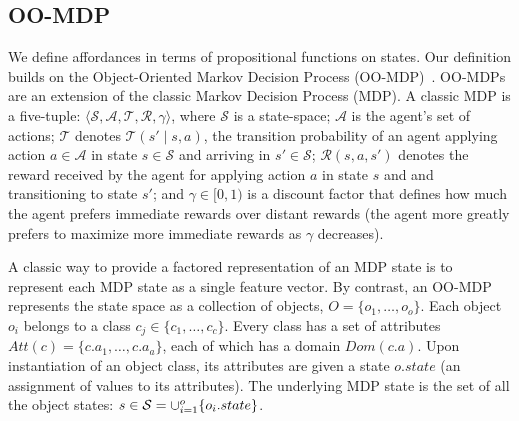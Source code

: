 \documentclass[]{article}
\begin{document}

\subsection{OO-MDP}

We define affordances in terms of propositional functions on states. Our definition builds on the Object-Oriented Markov Decision Process
(OO-MDP)~\citep{diuk08}.  OO-MDPs are an extension of
the classic Markov Decision Process (MDP).  A classic MDP is a
five-tuple: $\langle \mathcal{S}, \mathcal{A}, \mathcal{T},
\mathcal{R}, \gamma \rangle$, where $\mathcal{S}$ is a state-space;
$\mathcal{A}$ is the agent's set of actions; $\mathcal{T}$ denotes
$\mathcal{T}(s' \mid s,a)$, the transition probability of an agent
applying action $a \in \mathcal{A}$ in state $s \in \mathcal{S}$ and
arriving in $s' \in \mathcal{S}$; $\mathcal{R}(s,a,s')$ denotes the
reward received by the agent for applying action $a$ in state $s$ and
and transitioning to state $s'$; and $\gamma \in [0, 1)$ is a discount
  factor that defines how much the agent prefers immediate rewards
  over distant rewards (the agent more greatly prefers to maximize
  more immediate rewards as $\gamma$ decreases).

A classic way to provide a factored representation of an MDP state is to represent
each MDP state as a single feature vector. By contrast, an OO-MDP represents the state space as a collection of objects,
$O = \{o_1, \ldots, o_o \}$.  Each object $o_i$ belongs to a
class $c_j \in  \{c_1, \ldots, c_c\}$. Every class has a set of attributes
$Att(c) = \{c.a_1, \ldots, c.a_a \}$, each of which has a domain $Dom(c.a)$.
Upon instantiation of an object class, its attributes are given a state $o.state$
(an assignment of values to its attributes).  The underlying MDP state is the set
of all the object states: $s \in {\cal S} = \cup_{i = 1}^o \{o_i.state\}$.
\end{document}
